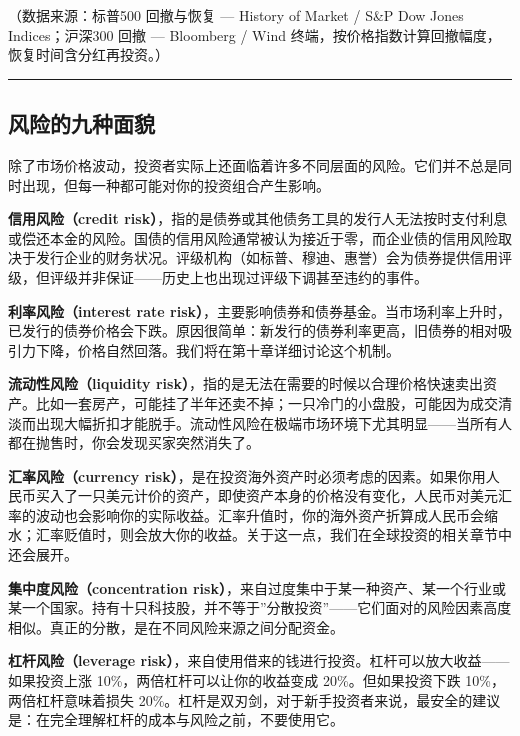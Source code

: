 \documentclass[a4paper,11pt,oneside,fontset=none,UTF8,zihao=-4]{ctexbook}
\begin{document}
（数据来源：标普500 回撤与恢复 --- History of Market / S\&P Dow Jones
Indices；沪深300 回撤 --- Bloomberg / Wind
终端，按价格指数计算回撤幅度，恢复时间含分红再投资。）

\begin{center}{\color{dh-bronze}\rule{0.2\textwidth}{0.5pt}}\end{center}

\subsection{风险的九种面貌}\label{ux98ceux9669ux7684ux4e5dux79cdux9762ux8c8c}

除了市场价格波动，投资者实际上还面临着许多不同层面的风险。它们并不总是同时出现，但每一种都可能对你的投资组合产生影响。

\textbf{信用风险（credit
risk）}，指的是债券或其他债务工具的发行人无法按时支付利息或偿还本金的风险。国债的信用风险通常被认为接近于零，而企业债的信用风险取决于发行企业的财务状况。评级机构（如标普、穆迪、惠誉）会为债券提供信用评级，但评级并非保证------历史上也出现过评级下调甚至违约的事件。

\textbf{利率风险（interest rate
risk）}，主要影响债券和债券基金。当市场利率上升时，已发行的债券价格会下跌。原因很简单：新发行的债券利率更高，旧债券的相对吸引力下降，价格自然回落。我们将在第十章详细讨论这个机制。

\textbf{流动性风险（liquidity
risk）}，指的是无法在需要的时候以合理价格快速卖出资产。比如一套房产，可能挂了半年还卖不掉；一只冷门的小盘股，可能因为成交清淡而出现大幅折扣才能脱手。流动性风险在极端市场环境下尤其明显------当所有人都在抛售时，你会发现买家突然消失了。

\textbf{汇率风险（currency
risk）}，是在投资海外资产时必须考虑的因素。如果你用人民币买入了一只美元计价的资产，即使资产本身的价格没有变化，人民币对美元汇率的波动也会影响你的实际收益。汇率升值时，你的海外资产折算成人民币会缩水；汇率贬值时，则会放大你的收益。关于这一点，我们在全球投资的相关章节中还会展开。

\textbf{集中度风险（concentration
risk）}，来自过度集中于某一种资产、某一个行业或某一个国家。持有十只科技股，并不等于''分散投资''------它们面对的风险因素高度相似。真正的分散，是在不同风险来源之间分配资金。

\textbf{杠杆风险（leverage
risk）}，来自使用借来的钱进行投资。杠杆可以放大收益------如果投资上涨
10\%，两倍杠杆可以让你的收益变成 20\%。但如果投资下跌
10\%，两倍杠杆意味着损失
20\%。杠杆是双刃剑，对于新手投资者来说，最安全的建议是：在完全理解杠杆的成本与风险之前，不要使用它。
\end{document}

